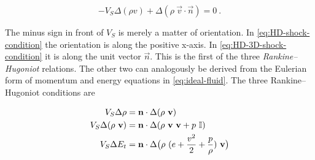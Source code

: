 \begin{equation}
\label{eq:HD-3D-shock-condition}
- V_S \Delta(\rho v) + \Delta(\rho \ \vec{v} \cdot \vec{n}) = 0 \ .
\end{equation}

The minus sign in front of $V_S$ is merely a matter of orientation. In \autoref{eq:HD-shock-condition} the orientation is along the positive x-axis. In \autoref{eq:HD-3D-shock-condition} it is along the unit vector $\vec{n}$. This is the first of the three \textit{Rankine–Hugoniot} relations. The other two can analogously be derived from the Eulerian form of momentum and energy equations in \autoref{eq:ideal-fluid}. The three Rankine–Hugoniot conditions are

\begin{equation}
\label{HD-shock-conditions}
\begin{split}
V_S \Delta \rho &= \vec{n}\cdot\Delta(\rho \ \vec{v})\\
V_S \Delta (\rho \ \vec{v}) &= \vec{n} \cdot \Delta(\rho \ \vec{v} \ \vec{v} + p \ \I) \\
V_S \Delta E_t &= \vec{n} \cdot \Delta \big (\rho \ (e + \frac{v^2}{2} + \frac{p}{\rho}) \ \vec{v} \big)
\end{split}
\end{equation}








